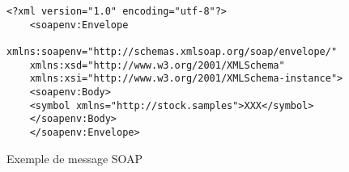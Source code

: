 \begin{figure}[h]
    \begin{Verbatim}[frame=single, fontsize=\scriptsize]
	<?xml version="1.0" encoding="utf-8"?>
	<soapenv:Envelope
	xmlns:soapenv="http://schemas.xmlsoap.org/soap/envelope/"
	xmlns:xsd="http://www.w3.org/2001/XMLSchema"
	xmlns:xsi="http://www.w3.org/2001/XMLSchema-instance">
	<soapenv:Body>
	<symbol xmlns="http://stock.samples">XXX</symbol>
	</soapenv:Body>
	</soapenv:Envelope>
    \end{Verbatim}
    \caption{Exemple de message SOAP}
    \label{fig:soap-message-example}
\end{figure}

